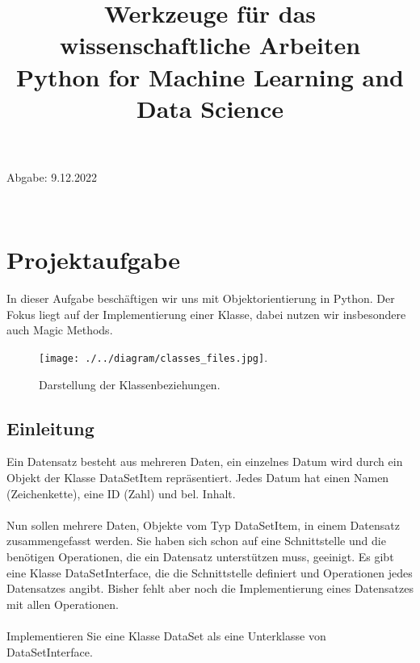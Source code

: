 \documentclass[]{article}
\title{\textbf{\huge Werkzeuge für das wissenschaftliche Arbeiten}\\
	Python for Machine Learning and Data Science\\}
\begin{document}
\maketitle
{ \centerline\small\hspace*{4.5cm}Abgabe: 9.12.2022} \\

\hrulefill
\tableofcontents %
\hrulefill

\section{Projektaufgabe}
In dieser Aufgabe beschäftigen wir uns mit Objektorientierung in Python.
Der Fokus liegt auf der Implementierung einer Klasse, dabei nutzen wir insbesondere auch Magic Methods.\\
\begin{figure}[htbp]
\begin{minipage}{\linewidth}
\renewcommand{\footnoterule}{}
\begin{center}
\texttt{[image: ./../diagram/classes\_files.jpg]}.
\end{center}
\caption[Darstellung der Klassenbeziehungen.]{Darstellung der Klassenbeziehungen.}
\end{minipage}
\end{figure}
\subsection{Einleitung}
Ein Datensatz besteht aus mehreren Daten, ein einzelnes Datum wird durch ein Objekt der Klasse \grqq DataSetItem\grqq{} repräsentiert.
Jedes Datum hat einen Namen (Zeichenkette), eine ID (Zahl) und bel. Inhalt.\\
\\
Nun sollen mehrere Daten, Objekte vom Typ \grqq DataSetItem\grqq{}, in einem Datensatz zusammengefasst werden.
Sie haben sich schon auf eine Schnittstelle und die benötigen Operationen, die ein Datensatz unterstützen muss, geeinigt.
Es gibt eine Klasse \grqq DataSetInterface\grqq{}, die die Schnittstelle definiert und Operationen jedes Datensatzes angibt.
Bisher fehlt aber noch die Implementierung eines Datensatzes mit allen Operationen.\\
\\
Implementieren Sie eine Klasse \grqq DataSet\grqq{} als eine Unterklasse von \grqq DataSetInterface\grqq .\\
\\
\end{document}
